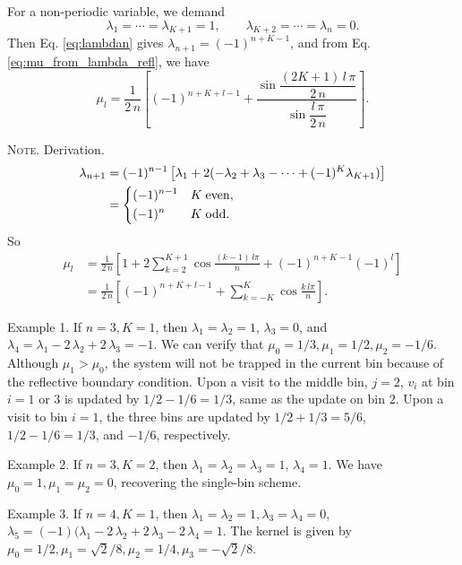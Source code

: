 \documentclass[preprint, floatfix]{revtex4-1}
\newcommand{\note}[1]{{\color{DarkGreen}\footnotesize \textsc{Note.} #1}}
\begin{document}
For a non-periodic variable, we demand
$$
\lambda_1 = \cdots = \lambda_{K+1} = 1,
\qquad
\lambda_{K+2} = \cdots = \lambda_n = 0.
$$
Then Eq. \eqref{eq:lambdan} gives
$\lambda_{n+1} = (-1)^{n+K-1}$,
and from Eq. \eqref{eq:mu_from_lambda_refl},
we have
\begin{equation}
  \mu_l
  =
  \frac{1}{2 \, n}
  \left[
    (-1)^{n+K+l-1}
    +
    \frac{
      \sin
      \dfrac{ (2 K + 1) \, l \, \pi }
           {         2 \, n        }
    }
    {
      \sin \dfrac{ l \, \pi } { 2 \, n }
    }
  \right]
  .
\label{eq:mu_sinc_refl}
\end{equation}
\note{Derivation.
$$
\begin{aligned}
  \lambda_{n+1}
  &=
  (-1)^{n-1}
  \left[
    \lambda_1
    + 2 (-\lambda_2 + \lambda_3 - \cdots + (-1)^K \lambda_{K+1})
  \right]
  \\
  &=
  \begin{dcases}
    (-1)^{n-1} & K \mathrm{\; even,} \\
    (-1)^n     & K \mathrm{\; odd.}
  \end{dcases}
\end{aligned}
$$
So
$$
\begin{aligned}
  \mu_l
  &=
  \frac{1}{2\,n}
  \left[
    1 +
    2 \sum_{k=2}^{K+1}
    \cos \frac { (k - 1) \, l \pi } { n }
    +
    (-1)^{n+K-1} (-1)^l
  \right]
  \\
  &=
  \frac{1}{2\,n}
  \left[
    (-1)^{n+K+l-1}
    +
    \sum_{k=-K}^{K}
    \cos \frac { k \, l \pi } { n }
  \right]
  .
\end{aligned}
$$

\hrulefill

Example 1. If $n = 3, K = 1$,
then $\lambda_1 = \lambda_2 = 1$, $\lambda_3 = 0$,
and $\lambda_4 = \lambda_1 - 2 \, \lambda_2 + 2 \, \lambda_3 = -1$.
%
We can verify that $\mu_0 = 1/3, \mu_1 = 1/2, \mu_2 = -1/6$.
%
Although $\mu_1 > \mu_0$, the system will not be trapped
in the current bin because of the reflective boundary condition.
%
Upon a visit to the middle bin, $j = 2$,
$v_i$ at bin $i = 1$ or $3$ is updated by $1/2 - 1/6 = 1/3$,
same as the update on bin $2$.
Upon a visit to bin $i = 1$, the three bins are updated
by $1/2 + 1/3 = 5/6$, $1/2 - 1/6 = 1/3$, and $-1/6$,
respectively.

\hrulefill

Example 2. If $n = 3, K = 2$,
then $\lambda_1 = \lambda_2 = \lambda_3 = 1$, $\lambda_4 = 1$.
We have $\mu_0 = 1, \mu_1 = \mu_2 = 0$,
recovering the single-bin scheme.

\hrulefill

Example 3. If $n = 4, K = 1$,
then $\lambda_1 = \lambda_2 = 1, \lambda_3 = \lambda_4 = 0$,
$\lambda_5 = (-1)(\lambda_1 - 2 \, \lambda_2 + 2 \, \lambda_3 - 2 \, \lambda_4 = 1$.
The kernel is given by
$\mu_0 = 1/2, \mu_1 = \sqrt{2}/8, \mu_2 = 1/4, \mu_3 = -\sqrt{2}/8$.
}
\end{document}

